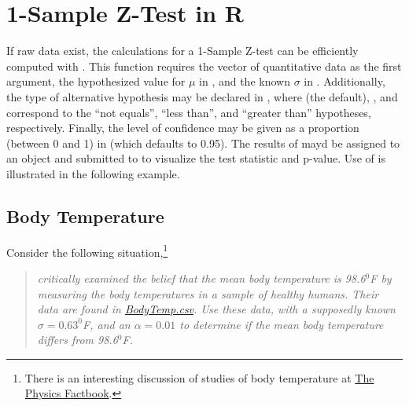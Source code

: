 \documentclass[10pt,openany]{book}\usepackage[]{graphicx}\usepackage[]{color}
\begin{document}
\section{1-Sample Z-Test in R}
\vspace{-12pt}
If raw data exist, the calculations for a 1-Sample Z-test can be efficiently computed with .  This function requires the vector of quantitative data as the first argument, the hypothesized value for $\mu$ in , and the known $\sigma$ in . Additionally, the type of alternative hypothesis may be declared in , where  (the default), , and  correspond to the ``not equals'', ``less than'', and ``greater than'' hypotheses, respectively. Finally, the level of confidence may be given as a proportion (between 0 and 1) in  (which defaults to 0.95). The results of  mayd be assigned to an object and submitted to  to visualize the test statistic and p-value. Use of  is illustrated in the following example.

\subsection{Body Temperature}
\vspace{-12pt}
Consider the following situation,\footnote{There is an interesting discussion of studies of body temperature at \href{http://hypertextbook.com/facts/LenaWong.shtml}{The Physics Factbook}.}
\vspace{-8pt}
\begin{quote}
\textsl{\cite{Machowiaketal1992} critically examined the belief that the mean body temperature is 98.6$^{0}$F by measuring the body temperatures in a sample of healthy humans.  Their data are found in \href{https://raw.githubusercontent.com/droglenc/NCData/master/BodyTemp.csv}{BodyTemp.csv}.  Use these data, with a supposedly known $\sigma=0.63^{0}$F, and an $\alpha=0.01$ to determine if the mean body temperature differs from 98.6$^{0}$F.}
\end{quote}
\end{document}
